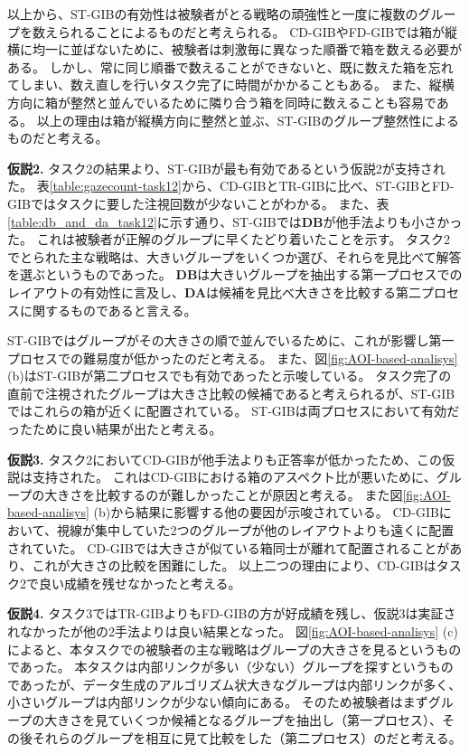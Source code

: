\documentclass{kuee}
\begin{document}
以上から、ST-GIBの有効性は被験者がとる戦略の頑強性と一度に複数のグループを数えられることによるものだと考えられる。
CD-GIBやFD-GIBでは箱が縦横に均一に並ばないために、被験者は刺激毎に異なった順番で箱を数える必要がある。
しかし、常に同じ順番で数えることができないと、既に数えた箱を忘れてしまい、数え直しを行いタスク完了に時間がかかることもある。
また、縦横方向に箱が整然と並んでいるために隣り合う箱を同時に数えることも容易である。
以上の理由は箱が縦横方向に整然と並ぶ、ST-GIBのグループ整然性によるものだと考える。

{\bf 仮説2.} タスク2の結果より、ST-GIBが最も有効であるという仮説2が支持された。
表\ref{table:gazecount-task12}から、CD-GIBとTR-GIBに比べ、ST-GIBとFD-GIBではタスクに要した注視回数が少ないことがわかる。
また、表\ref{table:db_and_da_task12}に示す通り、ST-GIBでは{\bf DB}が他手法よりも小さかった。
これは被験者が正解のグループに早くたどり着いたことを示す。
タスク2でとられた主な戦略は、大きいグループをいくつか選び、それらを見比べて解答を選ぶというものであった。
{\bf DB}は大きいグループを抽出する第一プロセスでのレイアウトの有効性に言及し、{\bf DA}は候補を見比べ大きさを比較する第二プロセスに関するものであると言える。

ST-GIBではグループがその大きさの順で並んでいるために、これが影響し第一プロセスでの難易度が低かったのだと考える。
また、図\ref{fig:AOI-based-analisys} (b)はST-GIBが第二プロセスでも有効であったと示唆している。
タスク完了の直前で注視されたグループは大きさ比較の候補であると考えられるが、ST-GIBではこれらの箱が近くに配置されている。
ST-GIBは両プロセスにおいて有効だったために良い結果が出たと考える。

{\bf 仮説3.} タスク2においてCD-GIBが他手法よりも正答率が低かったため、この仮説は支持された。
これはCD-GIBにおける箱のアスペクト比が悪いために、グループの大きさを比較するのが難しかったことが原因と考える。
また図\ref{fig:AOI-based-analisys} (b)から結果に影響する他の要因が示唆されている。
CD-GIBにおいて、視線が集中していた2つのグループが他のレイアウトよりも遠くに配置されていた。
CD-GIBでは大きさが似ている箱同士が離れて配置されることがあり、これが大きさの比較を困難にした。
以上二つの理由により、CD-GIBはタスク2で良い成績を残せなかったと考える。

{\bf 仮説4.} タスク3ではTR-GIBよりもFD-GIBの方が好成績を残し、仮説3は実証されなかったが他の2手法よりは良い結果となった。
図\ref{fig:AOI-based-analisys} (c)によると、本タスクでの被験者の主な戦略はグループの大きさを見るというものであった。
本タスクは内部リンクが多い（少ない）グループを探すというものであったが、データ生成のアルゴリズム状大きなグループは内部リンクが多く、小さいグループは内部リンクが少ない傾向にある。
そのため被験者はまずグループの大きさを見ていくつか候補となるグループを抽出し（第一プロセス）、その後それらのグループを相互に見て比較をした（第二プロセス）のだと考える。
\end{document}
